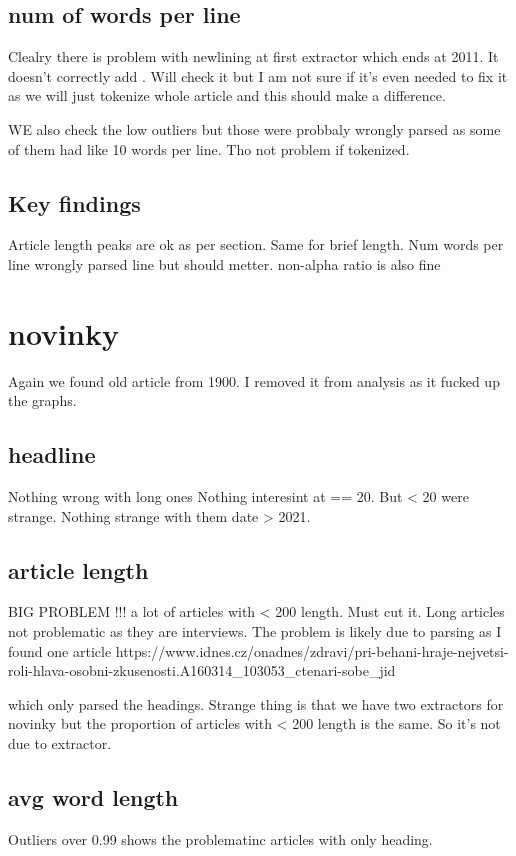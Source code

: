 \documentclass{article}
\begin{document}
    \subsection{num of words per line}
    Clealry there is problem with newlining at first extractor which ends at 2011. It doesn't correctly add \n. Will check it but I am not sure if it's even needed to fix it as we will just tokenize whole article and this should make a difference.

    WE also check the low outliers but those were probbaly wrongly parsed as some of them had like 10 words per line. Tho not problem if tokenized.

    \subsection{Key findings}
    Article length peaks are ok as per section. Same for brief length.
    Num words per line wrongly parsed line but should metter. non-alpha ratio is also fine

    \section{novinky}
    Again we found old article from 1900. I removed it from analysis as it fucked up the graphs.
    \subsection{headline}
        Nothing wrong with long ones
        Nothing interesint at == 20. But < 20 were strange.
        Nothing strange with them date > 2021.

    \subsection{article length}
        BIG PROBLEM !!! a lot of articles with < 200 length. Must cut it.
        Long articles not problematic as they are interviews.
        The problem is likely due to parsing as I found one article https://www.idnes.cz/onadnes/zdravi/pri-behani-hraje-nejvetsi-roli-hlava-osobni-zkusenosti.A160314_103053_ctenari-sobe_jid

        which only parsed the headings.
        Strange thing is that we have two extractors for novinky but the proportion of articles with < 200 length is the same. So it's not due to extractor.

    \subsection{avg word length}
        Outliers over 0.99 shows the problematinc articles with only heading.
\end{document}
